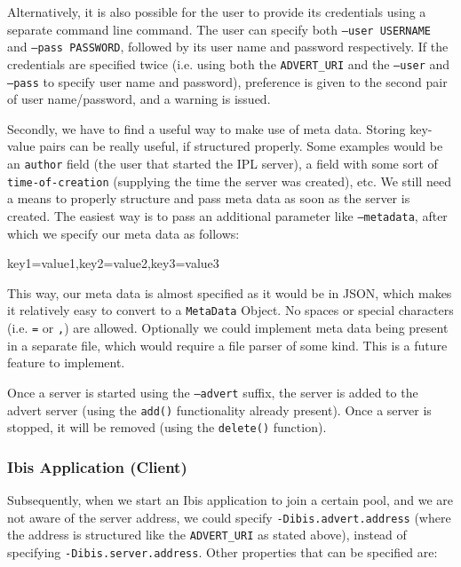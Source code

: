 Alternatively, it is also possible for the user to provide its credentials
using a separate command line command. The user can specify both \texttt{--user
USERNAME} and \texttt{--pass PASSWORD}, followed by its user name and password
respectively. If the credentials are specified twice (i.e. using both the
\texttt{ADVERT\_URI} and the \texttt{--user} and \texttt{--pass} to specify
user name and password), preference is given to the second pair of
user name/password, and a warning is issued.

Secondly, we have to find a useful way to make use of meta data. Storing
key-value pairs can be really useful, if structured properly. Some examples
would be an \texttt{author} field (the user that started the IPL server), a
field with some sort of \texttt{time-of-creation} (supplying the time the
server was created), etc. We still need a means to properly structure
and pass meta data as soon as the server is created. The easiest way is to pass
an additional parameter like \texttt{--metadata}, after which we specify our
meta data as follows:

\begin{center}
\begin{code}
key1=value1,key2=value2,key3=value3
\end{code}
\end{center}

This way, our meta data is almost specified as it would be in JSON, which makes
it relatively easy to convert to a \texttt{MetaData} Object. No spaces or
special characters (i.e. \texttt{=} or \texttt{,}) are allowed. Optionally we
could implement meta data being present in a separate file, which would require a
file parser of some kind. This is a future feature to implement.

Once a server is started using the \texttt{--advert} suffix, the server is added
to the advert server (using the \texttt{add()} functionality already present).
Once a server is stopped, it will be removed (using the \texttt{delete()}
function).

\subsubsection{Ibis Application (Client)}
Subsequently, when we start an Ibis application to join a certain pool, and we
are not aware of the server address, we could specify
\texttt{-Dibis.advert.address} (where the address is structured like the
\texttt{ADVERT\_URI} as stated above), instead of specifying
\texttt{-Dibis.server.address}. Other properties that can be specified are:

